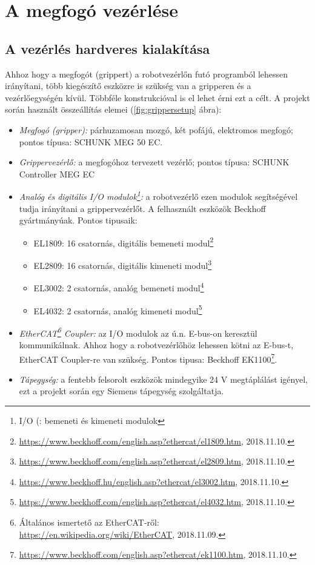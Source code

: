 \documentclass[../documentation.tex]{subfiles}
\begin{document}
\section{A megfogó vezérlése}
\subsection{A vezérlés hardveres kialakítása}
Ahhoz hogy a megfogót (grippert) a robotvezérlőn futó programból lehessen irányítani, több kiegészítő eszközre is szükség van a gripperen és a vezérlőegységén kívül. Többféle konstrukcióval is el lehet érni ezt a célt. A projekt során használt összeállítás elemei (\ref{fig:grippersetup} ábra):
\begin{itemize}
	\item \textit{Megfogó (gripper):} párhuzamosan mozgó, két pofájú, elektromos megfogó; pontos típusa: SCHUNK MEG 50 EC\cite{grippermanual}.
	\item \textit{Grippervezérlő:} a megfogóhoz tervezett vezérlő; pontos típusa: SCHUNK Controller MEG EC\cite{grippermanual}
	\item \textit{Analóg és digitális I/O modulok\footnote{I/O (: bemeneti és kimeneti modulok}:} a robotvezérlő ezen modulok segítségével tudja irányítani a grippervezérlőt. A felhasznált eszközök Beckhoff gyártmányúak. Pontos tipusaik:
	\begin{itemize}
		\item EL1809: 16 csatornás, digitális bemeneti modul\footnote{\url{https://www.beckhoff.com/english.asp?ethercat/el1809.htm}, 2018.11.10.}
		\item EL2809: 16 csatornás, digitális kimeneti modul\footnote{\url{https://www.beckhoff.com/english.asp?ethercat/el2809.htm}, 2018.11.10.}
		\item EL3002: 2 csatornás, analóg bemeneti modul\footnote{\url{https://www.beckhoff.hu/english.asp?ethercat/el3002.htm}, 2018.11.10.}
		\item EL4032: 2 csatornás, analóg kimeneti modul\footnote{\url{https://www.beckhoff.com/english.asp?ethercat/el4032.htm}, 2018.11.10.}
	\end{itemize}
	\item \textit{EtherCAT\footnote{Általános ismertető az EtherCAT-ről: \url{https://en.wikipedia.org/wiki/EtherCAT}, 2018.11.09.} Coupler:} az I/O modulok az ú.n. E-bus-on keresztül kommunikálnak. Ahhoz hogy a robotvezérlőhöz lehessen kötni az E-bus-t, EtherCAT Coupler-re van szükség. Pontos tipusa: Beckhoff EK1100\footnote{\url{https://www.beckhoff.com/english.asp?ethercat/ek1100.htm}, 2018.11.10.}.
	\item \textit{Tápegység:} a fentebb felsorolt eszközök mindegyike 24 V megtáplálást igényel, ezt a projekt során egy Siemens tápegység szolgáltatja.
\end{itemize}
\end{document}
